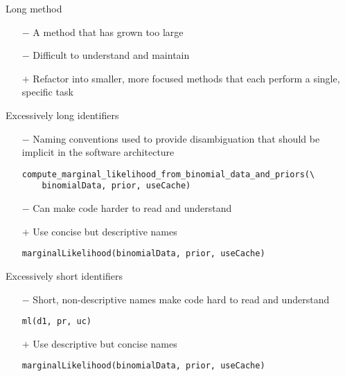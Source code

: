 \documentclass{beamer}
\begin{document}
\begin{frame}[fragile]{Long method}
\begin{itemize}
    \item[$-$] A method that has grown too large
    \item[$-$] Difficult to understand and maintain
    \item[$+$] Refactor into smaller, more focused methods that each perform a single, specific task
\end{itemize}
\end{frame}

\begin{frame}[fragile]{Excessively long identifiers}
\begin{itemize}
    \item[$-$] Naming conventions used to provide disambiguation that should be implicit in the software architecture
\begin{lstlisting}[style=python]
compute_marginal_likelihood_from_binomial_data_and_priors(\
    binomialData, prior, useCache)
\end{lstlisting}
    \item[$-$] Can make code harder to read and understand
    \item[$+$] Use concise but descriptive names
\begin{lstlisting}[style=python]
marginalLikelihood(binomialData, prior, useCache)
\end{lstlisting}
\end{itemize}
\end{frame}

\begin{frame}[fragile]{Excessively short identifiers}
\begin{itemize}
    \item[$-$] Short, non-descriptive names make code hard to read and understand
\begin{lstlisting}[style=python]
ml(d1, pr, uc)
\end{lstlisting}
    \item[$+$] Use descriptive but concise names
\begin{lstlisting}[style=python]
marginalLikelihood(binomialData, prior, useCache)
\end{lstlisting}
\end{itemize}
\end{frame}
\end{document}
